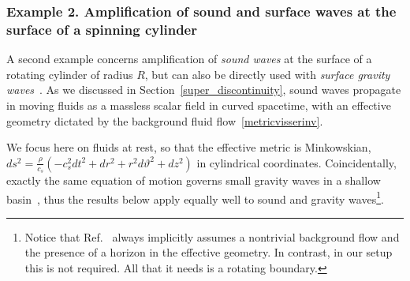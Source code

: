 \documentclass[11pt]{article}
\numberwithin{equation}{section} %
\begin{document}
\subsubsection{Example 2. Amplification of sound and surface waves at the surface of a spinning cylinder\label{sec:lab}}
A second example concerns amplification of {\it sound waves} at the surface of a rotating cylinder of radius $R$, 
but can also be directly used with {\it surface gravity waves}~\cite{Cardoso:2016zvz}. 
As we discussed in Section~\ref{super_discontinuity}, sound waves propagate in moving fluids as a massless scalar field in curved spacetime,
with an effective geometry dictated by the background fluid flow~\eqref{metricvisserinv}.


We focus here on fluids at rest, so that the effective metric is Minkowskian,
$ds^2=\frac{\rho}{c_s}\left(-c_s^2dt^2+dr^2+r^2d\vartheta^2+dz^2\right)$ in cylindrical coordinates.
Coincidentally, exactly the same equation of motion governs small gravity waves in a shallow basin~\cite{Schutzhold:2002rf},
thus the results below apply equally well to sound and gravity waves\footnote{Notice that Ref.~\cite{Schutzhold:2002rf} always implicitly
assumes a nontrivial background flow and the presence of a horizon in the effective geometry. In contrast, in our setup this is not required. 
All that it needs is a rotating boundary.}.
\end{document}
